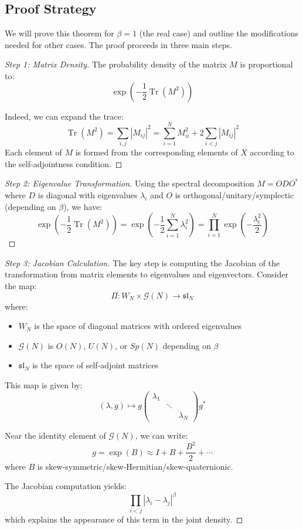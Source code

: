 \documentclass[letterpaper,11pt,oneside,reqno]{article}
\numberwithin{equation}{section}
\theoremstyle{definition}
\begin{document}
\subsection{Proof Strategy}

We will prove this theorem for $\beta=1$ (the real case) and outline the modifications needed for other cases. The proof proceeds in three main steps.

\begin{proof}[Step 1: Matrix Density]
The probability density of the matrix $M$ is proportional to:
\[ \exp\left(-\frac{1}{2}\operatorname{Tr}(M^2)\right) \]

Indeed, we can expand the trace:
\[ \operatorname{Tr}(M^2) = \sum_{i,j} |M_{ij}|^2 = \sum_{i=1}^N M_{ii}^2 + 2\sum_{i<j} |M_{ij}|^2 \]
Each element of $M$ is formed from the corresponding elements of $X$ according to the self-adjointness condition.
\end{proof}

\begin{proof}[Step 2: Eigenvalue Transformation]
Using the spectral decomposition $M = ODO^*$ where $D$ is diagonal with eigenvalues $\lambda_i$ and $O$ is orthogonal/unitary/symplectic (depending on $\beta$), we have:
\[ \exp\left(-\frac{1}{2}\operatorname{Tr}(M^2)\right) = \exp\left(-\frac{1}{2}\sum_{i=1}^N \lambda_i^2\right) = \prod_{i=1}^N \exp\left(-\frac{\lambda_i^2}{2}\right) \]
\end{proof}


\begin{proof}[Step 3: Jacobian Calculation]
The key step is computing the Jacobian of the transformation from matrix elements to eigenvalues and eigenvectors. Consider the map:
\[ \Pi: W_N \times \mathcal{G}(N) \to \mathfrak{sl}_N \]
where:
\begin{itemize}
\item $W_N$ is the space of diagonal matrices with ordered eigenvalues
\item $\mathcal{G}(N)$ is $O(N)$, $U(N)$, or $Sp(N)$ depending on $\beta$
\item $\mathfrak{sl}_N$ is the space of self-adjoint matrices
\end{itemize}

This map is given by:
\[ (\lambda, g) \mapsto g\begin{pmatrix}\lambda_1 & & \\ & \ddots & \\ & & \lambda_N\end{pmatrix}g^* \]

Near the identity element of $\mathcal{G}(N)$, we can write:
\[ g = \exp(B) \approx I + B + \frac{B^2}{2} + \cdots \]
where $B$ is skew-symmetric/skew-Hermitian/skew-quaternionic.

The Jacobian computation yields:
\[ \prod_{i<j} |\lambda_i-\lambda_j|^\beta \]
which explains the appearance of this term in the joint density.
\end{proof}
\end{document}
